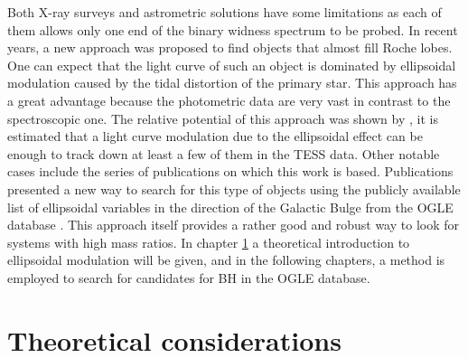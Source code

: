\documentclass{pracalicmgr}
\begin{document}
Both X-ray surveys and astrometric solutions have some limitations as each of them allows only one end of the binary widness spectrum to be probed.
In recent years, a new approach was proposed to find objects that almost fill Roche lobes. One can expect that the light curve of such an object
is dominated by ellipsoidal modulation caused by the tidal distortion of the primary star. This approach has a great advantage because the photometric
data are very vast in contrast to the spectroscopic one.
The relative potential of this approach was shown by \citet{masuda_prospects_2019}, it is estimated that a light curve modulation due to the ellipsoidal effect can be enough to track down
at least a few of them in the TESS data. Other notable cases include the series of publications \citet{gomel_search_2021-1,gomel_search_2021-2,gomel_search_2021-3} on which this work is based.
Publications presented a new way to search for this type of objects using the publicly available list of ellipsoidal variables in the direction of the Galactic Bulge from the OGLE database \citep{soszynski_ogle_2016}. This approach itself provides a rather good and robust way to look for systems with high mass ratios. In chapter \ref{theo} a theoretical
introduction to ellipsoidal modulation will be given, and in the following chapters, a method is employed to search for candidates for BH in the OGLE database.

\chapter{Theoretical considerations}\label{theo}
\end{document}
